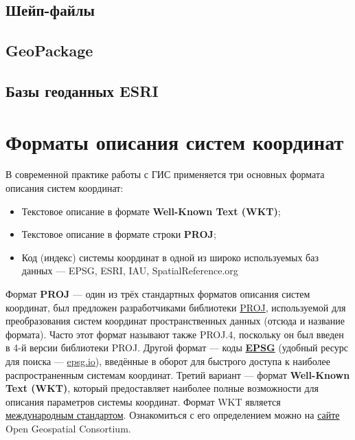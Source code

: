 \documentclass[
  12pt,
]{book}
\providecommand{\tightlist}{%
  \setlength{\itemsep}{0pt}\setlength{\parskip}{0pt}}
\begin{document}
\hypertarget{manual-dataformats-shapefile}{%
\section{Шейп-файлы}\label{manual-dataformats-shapefile}}

\hypertarget{geopackage}{%
\section{GeoPackage}\label{geopackage}}

\hypertarget{ux431ux430ux437ux44b-ux433ux435ux43eux434ux430ux43dux43dux44bux445-esri}{%
\section{Базы геоданных ESRI}\label{ux431ux430ux437ux44b-ux433ux435ux43eux434ux430ux43dux43dux44bux445-esri}}

\hypertarget{manual-crs}{%
\chapter{Форматы описания систем координат}\label{manual-crs}}

В современной практике работы с ГИС применяется три основных формата описания систем координат:

\begin{itemize}
\tightlist
\item
  Текстовое описание в формате \textbf{Well-Known Text (WKT)};
\item
  Текстовое описание в формате строки \textbf{PROJ};
\item
  Код (индекс) системы координат в одной из широко используемых баз данных --- EPSG, ESRI, IAU, SpatialReference.org
\end{itemize}

Формат \textbf{PROJ} --- один из трёх стандартных форматов описания систем координат, был предложен разработчиками библиотеки \href{https://proj.org/}{PROJ}, используемой для преобразования систем координат пространственных данных (отсюда и название формата). Часто этот формат называют также PROJ.4, поскольку он был введен в 4-й версии библиотеки PROJ. Другой формат --- коды \href{http://www.epsg-registry.org/}{\textbf{EPSG}} (удобный ресурс для поиска --- \href{https://epsg.io/}{epsg.io}), введённые в оборот для быстрого доступа к наиболее распространенным системам координат. Третий вариант --- формат \textbf{Well-Known Text (WKT)}, который предоставляет наиболее полные возможности для описания параметров системы координат. Формат WKT является \href{https://www.iso.org/standard/76496.html}{международным стандартом}. Ознакомиться с его определением можно на \href{http://docs.opengeospatial.org/is/18-010r7/18-010r7.html}{сайте} Open Geospatial Consortium.
\end{document}
